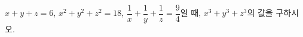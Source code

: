 $x+y+z=6$, $x^2+y^2+z^2=18$, $\dfrac{1}{x}+\dfrac{1}{y}+\dfrac{1}{z}=\dfrac{9}{4}$일 때, $x^3+y^3+z^3$의 값을 구하시오.
